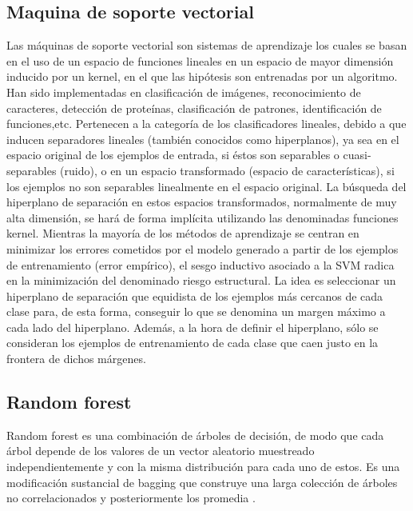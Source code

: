 \subsection{Maquina de soporte vectorial}

Las máquinas de soporte vectorial son sistemas de aprendizaje los
cuales se basan en el uso de un espacio de funciones lineales en un espacio de mayor dimensión inducido
por un kernel, en el que las hipótesis son entrenadas por un algoritmo\citep{CT8}.
Han sido implementadas en clasificación de imágenes, reconocimiento de caracteres, detección de
proteínas, clasificación de patrones, identificación de funciones,etc.
Pertenecen a la categoría de los clasificadores lineales, debido a que inducen separadores lineales
(también conocidos como hiperplanos), ya sea en el espacio original de los ejemplos de entrada, si éstos son separables o cuasi-separables (ruido), o en un espacio transformado (espacio de características),
si los ejemplos no son separables linealmente en el espacio original. La búsqueda del hiperplano
de separación en estos espacios transformados, normalmente de muy alta dimensión, se hará de forma
implícita utilizando las denominadas funciones kernel. Mientras la mayoría de los métodos de aprendizaje
se centran en minimizar los errores cometidos por el modelo generado a partir de los ejemplos
de entrenamiento (error empírico), el sesgo inductivo asociado a la SVM radica en la minimización
del denominado riesgo estructural.
La idea es seleccionar un hiperplano de separación que equidista de los ejemplos más cercanos de
cada clase para, de esta forma, conseguir lo que se denomina un margen máximo a cada lado del hiperplano.
Además, a la hora de definir el hiperplano, sólo se consideran los ejemplos de entrenamiento
de cada clase que caen justo en la frontera de dichos márgenes. 

\subsection{Random forest}

Random forest es una combinación de árboles de decisión, de modo que cada árbol depende de los valores de un vector 
aleatorio muestreado independientemente y con la misma distribución para cada uno de estos. Es una modificación sustancial de bagging que construye una 
larga colección de árboles no correlacionados y posteriormente los promedia \citep{CT9}.\\


